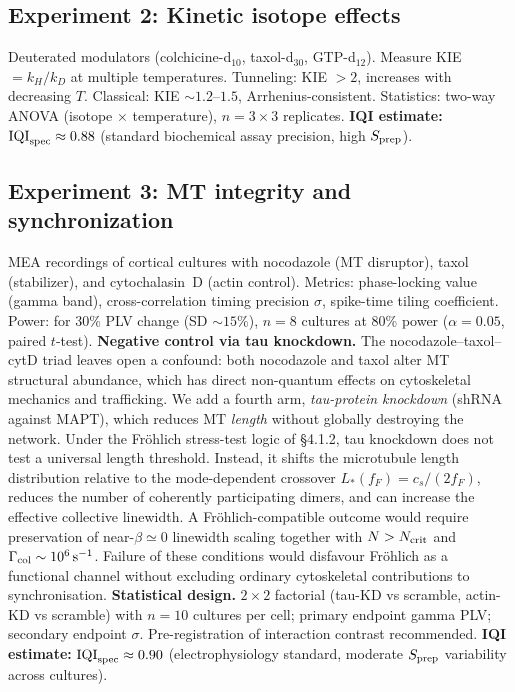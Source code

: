 \documentclass[twocolumn,10pt]{article}
\begin{document}
\subsection{Experiment 2: Kinetic isotope effects}
Deuterated modulators (colchicine-d$_{10}$, taxol-d$_{30}$, GTP-d$_{12}$).
Measure KIE $= k_H/k_D$ at multiple temperatures. Tunneling: KIE $> 2$,
increases with decreasing $T$. Classical: KIE $\sim 1.2\text{--}1.5$,
Arrhenius-consistent. Statistics: two-way ANOVA (isotope $\times$
temperature), $n = 3 \times 3$ replicates.
\textbf{IQI estimate:} $\text{IQI}_{\rm spec} \approx 0.88$ (standard biochemical assay precision, high $S_{\rm prep}$).

\subsection{Experiment 3: MT integrity and synchronization}
\label{sec:exp3}
MEA recordings of cortical cultures with nocodazole (MT disruptor), taxol
(stabilizer), and cytochalasin~D (actin control). Metrics: phase-locking
value (gamma band), cross-correlation timing precision $\sigma$,
spike-time tiling coefficient. Power: for 30\% PLV change (SD $\sim 15\%$),
$n = 8$ cultures at 80\% power ($\alpha = 0.05$, paired $t$-test).
\textbf{Negative control via tau knockdown.} The nocodazole--taxol--cytD
triad leaves open a confound: both nocodazole and taxol alter MT
structural abundance, which has direct non-quantum effects on
cytoskeletal mechanics and trafficking. We add a fourth arm, \emph{tau-protein
knockdown} (shRNA against MAPT), which reduces MT \emph{length}
without globally destroying the network. Under the Fr\"ohlich stress-test logic of \S 4.1.2, tau knockdown does not
test a universal length threshold. Instead, it shifts the
microtubule length distribution relative to the mode-dependent crossover
\(L_*(f_F)=c_s/(2f_F)\), reduces the number of coherently participating dimers,
and can increase the effective collective linewidth. A Fr\"ohlich-compatible
outcome would require preservation of near-\(\beta\simeq0\) linewidth scaling
together with \(N>N_{\rm crit}\) and \(\Gamma_{\rm col}\sim10^6\,{\rm s}^{-1}\).
Failure of these conditions would disfavour Fr\"ohlich as a functional channel
without excluding ordinary cytoskeletal contributions to synchronisation.
\textbf{Statistical design.} $2\times 2$ factorial (tau-KD vs scramble,
actin-KD vs scramble) with $n=10$ cultures per cell; primary endpoint
gamma PLV; secondary endpoint $\sigma$. Pre-registration of interaction
contrast recommended.
\textbf{IQI estimate:} $\text{IQI}_{\rm spec} \approx 0.90$ (electrophysiology standard, moderate $S_{\rm prep}$ variability across cultures).
\end{document}
